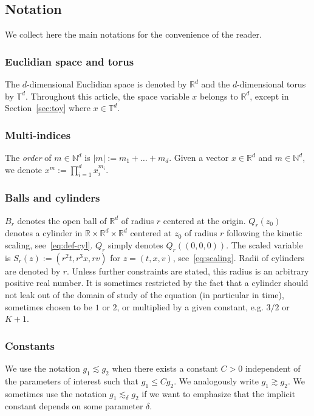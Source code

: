 \documentclass[AHL,Unicode,longabstracts,published]{cedram}
\newcommand{\N}{\mathbb{N}}
\newcommand{\R}{\mathbb{R}}
\newcommand{\T}{\mathbb{T}}
\begin{document}
\subsection{Notation}
We collect here the main notations for the convenience of the reader.

\subsubsection{Euclidian space and torus}
The $d$-dimensional Euclidian space is denoted by $\R^d$ and the $d$-dimensional torus by $\T^d$. Throughout this article, the space variable $x$ belongs to $\R^d$, except in Section~\ref{sec:toy} where $x \in \T^d$.

\subsubsection{Multi-indices}
The \emph{order} of $m \in \N^d$ is $|m| := m_1+\dots+m_d$. Given a vector $x \in \R^d$ and $m \in \N^d$, we denote $x^m := \prod_{i=1} ^d x_i^{m_i}$.

\subsubsection{Balls and cylinders}
$B_r$ denotes the open ball of $\R^d$ of radius $r$ centered at the origin. $Q_r(z_0)$ denotes a cylinder in $\R \times \R^d \times \R^d$ centered at $z_0$ of radius $r$ following the kinetic scaling, see~\eqref{eq:def-cyl}. $Q_r$ simply denotes $Q_r((0,0,0))$. The scaled variable is $S_r (z):=(r^2t,r^3x,rv)$ for $z=(t,x,v)$, see~\eqref{eq:scaling}. Radii of cylinders are denoted by $r$. Unless further constraints are stated, this radius is an arbitrary positive real number. It is sometimes restricted by the fact that a cylinder should not leak out of the domain of study of the equation (in particular in time), sometimes chosen to be $1$ or $2$, or multiplied by a given constant, e.g. $3/2$ or $K+1$.

\subsubsection{Constants}
We use the notation $g_1 \lesssim g_2$ when there exists a constant $C > 0$ independent of the parameters of interest such that $g_1 \leq C g_2$. We analogously write $g_1 \gtrsim g_2$. We sometimes use the notation $g_1 \lesssim_{\delta} g_2$ if we want to emphasize that the implicit constant depends on some parameter $\delta$.
\end{document}
